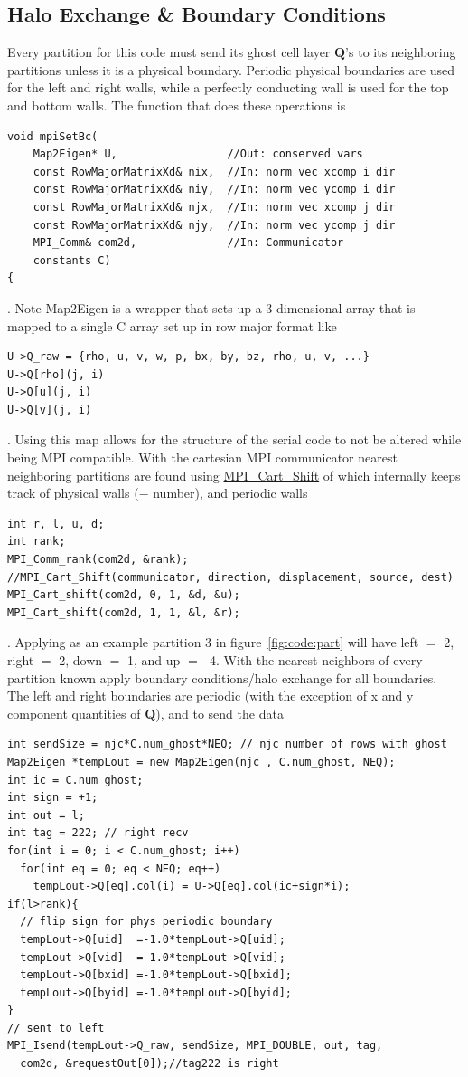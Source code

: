 \documentclass[paper=a4, fontsize=11pt]{scrartcl}
\numberwithin{equation}{section}                %
\numberwithin{figure}{section}                  %
\numberwithin{table}{section}                           %
\begin{document}
\subsection{Halo Exchange \& Boundary Conditions}
Every partition for this code must send its ghost cell layer $\mathbf{Q}$'s to its neighboring partitions unless it is a physical boundary. Periodic physical boundaries are used for the left and right walls, while a perfectly conducting wall is used for the top and bottom walls. The function that does these operations is
\begin{verbatim}
void mpiSetBc(
    Map2Eigen* U,                 //Out: conserved vars
    const RowMajorMatrixXd& nix,  //In: norm vec xcomp i dir
    const RowMajorMatrixXd& niy,  //In: norm vec ycomp i dir
    const RowMajorMatrixXd& njx,  //In: norm vec xcomp j dir
    const RowMajorMatrixXd& njy,  //In: norm vec ycomp j dir
    MPI_Comm& com2d,              //In: Communicator 
    constants C)                   
{
\end{verbatim}
. Note Map2Eigen is a wrapper that sets up a 3 dimensional array that is mapped to a single C array set up in row major format like
\begin{verbatim}
U->Q_raw = {rho, u, v, w, p, bx, by, bz, rho, u, v, ...}
U->Q[rho](j, i)
U->Q[u](j, i)
U->Q[v](j, i)
\end{verbatim}
. Using this map allows for the structure of the serial code to not be altered while being MPI compatible. With the cartesian MPI communicator nearest neighboring partitions are found using \href{https://www.mpich.org/static/docs/v3.2/www3/MPI_Cart_shift.html}{MPI\_Cart\_Shift} of which internally keeps track of physical walls ($-$ number), and periodic walls
\begin{verbatim}
int r, l, u, d;
int rank;
MPI_Comm_rank(com2d, &rank);
//MPI_Cart_Shift(communicator, direction, displacement, source, dest)
MPI_Cart_shift(com2d, 0, 1, &d, &u); 
MPI_Cart_shift(com2d, 1, 1, &l, &r);
\end{verbatim}
. Applying as an example partition 3 in figure~\ref{fig:code:part} will have left $=$ 2, right $=$ 2, down $=$ 1, and up $=$ -4. With the nearest neighbors of every partition known apply boundary conditions/halo exchange for all boundaries. The left and right boundaries are periodic (with the exception of x and y component quantities of $\mathbf{Q}$), and to send the data 
\begin{verbatim}
int sendSize = njc*C.num_ghost*NEQ; // njc number of rows with ghost
Map2Eigen *tempLout = new Map2Eigen(njc , C.num_ghost, NEQ);
int ic = C.num_ghost;
int sign = +1;
int out = l;
int tag = 222; // right recv
for(int i = 0; i < C.num_ghost; i++)
  for(int eq = 0; eq < NEQ; eq++)
    tempLout->Q[eq].col(i) = U->Q[eq].col(ic+sign*i);
if(l>rank){
  // flip sign for phys periodic boundary
  tempLout->Q[uid]  =-1.0*tempLout->Q[uid];
  tempLout->Q[vid]  =-1.0*tempLout->Q[vid];
  tempLout->Q[bxid] =-1.0*tempLout->Q[bxid];
  tempLout->Q[byid] =-1.0*tempLout->Q[byid];
}
// sent to left 
MPI_Isend(tempLout->Q_raw, sendSize, MPI_DOUBLE, out, tag, 
  com2d, &requestOut[0]);//tag222 is right
\end{verbatim}
\end{document}
